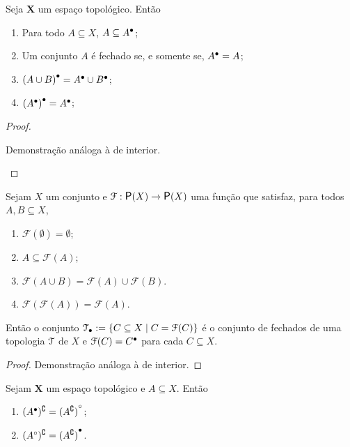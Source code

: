 \begin{proposition}
	Seja $\bm X$ um espaço topológico. Então
	\begin{enumerate}	
	\item Para todo $A \subseteq X$, $A \subseteq {A}^\bullet$;
	\item Um conjunto $A$ é fechado se, e somente se, ${A}^\bullet=A$;
	\item ${(A \cup B)}^\bullet = {A}^\bullet \cup {B}^\bullet$;
	\item ${({A}^\bullet)}^\bullet = {A}^\bullet$;
	\end{enumerate}
\end{proposition}
\begin{proof}
	\begin{enumerate}
	Demonstração análoga à de interior.
	\end{enumerate}
\end{proof}

\begin{proposition}
	Sejam $X$ um conjunto e $\mathcal F: \p(X) \to \p(X)$ uma função que satisfaz, para todos $A,B \subseteq X$,
	\begin{enumerate}
	\item $\mathcal F(\emptyset) = \emptyset$;
	\item $A \subseteq \mathcal F(A)$;
	\item $\mathcal F(A \cup B) = \mathcal F(A) \cup \mathcal F(B)$.
	\item $\mathcal F(\mathcal F(A)) = \mathcal F(A)$.
	\end{enumerate}
	
Então o conjunto $\mathcal{T}_{\bullet} := \left\{{C \subseteq X}\;\middle\vert\;{C = \mathcal F(C)}\right\}$ é o conjunto de fechados de uma topologia $\mathcal{T}$ de $X$ e $\mathcal F(C) = {C}^\bullet$ para cada $C \subseteq X$.
\end{proposition}
\begin{proof}
	Demonstração análoga à de interior.
\end{proof}


\begin{exercise}
	Sejam $\bm X$ um espaço topológico e $A \subseteq X$. Então
	\begin{enumerate}
	\item $({A}^\bullet)^\complement = {(A^\complement)}^\circ$;
	\item $({A}^\circ)^\complement = {(A^\complement)}^\bullet$.
	\end{enumerate}
\end{exercise}



